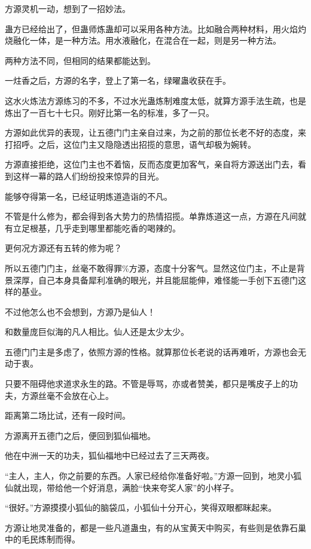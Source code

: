
\begin{this_body}

方源灵机一动，想到了一招妙法。

蛊方已经给出了，但蛊师炼蛊却可以采用各种方法。比如融合两种材料，用火焰灼烧融化一体，是一种方法。用水液融化，在混合在一起，则是另一种方法。

两种方法不同，但相同的结果都能达到。

一炷香之后，方源的名字，登上了第一名，绿曜蛊收获在手。

这水火炼法方源练习的不多，不过水光蛊炼制难度太低，就算方源手法生疏，也是炼出了一百七十七只。刚好比第一名的标准，多了一只。

方源如此优异的表现，让五德门门主亲自过来，为之前的那位长老不好的态度，来打招呼。之后，这位门主又隐隐透出招揽的意思，语气却极为婉转。

方源直接拒绝，这位门主也不着恼，反而态度更加客气，亲自将方源送出门去，看到这样一幕的路人们纷纷投来惊异的目光。

能够夺得第一名，已经证明炼道造诣的不凡。

不管是什么修为，都会得到各大势力的热情招揽。单靠炼道这一点，方源在凡间就有立足根基，几乎走到哪里都能吃香的喝辣的。

更何况方源还有五转的修为呢？

所以五德门门主，丝毫不敢得罪\%方源，态度十分客气。显然这位门主，不止是背景深厚，自己本身具备犀利准确的眼光，并且能屈能伸，难怪能一手创下五德门这样的基业。

不过他怎么也不会想到，方源乃是仙人！

和数量庞巨似海的凡人相比。仙人还是太少太少。

五德门门主是多虑了，依照方源的性格。就算那位长老说的话再难听，方源也会无动于衷。

只要不阻碍他求道求永生的路。不管是辱骂，亦或者赞美，都只是嘴皮子上的功夫，方源丝毫不会放在心上。

距离第二场比试，还有一段时间。

方源离开五德门之后，便回到狐仙福地。

他在中洲一天的功夫，狐仙福地中已经过去了三天两夜。

“主人，主人，你之前要的东西。人家已经给你准备好啦。”方源一回到，地灵小狐仙就出现，带给他一个好消息，满脸“快来夸奖人家”的小样子。

“很好。”方源摸摸小狐仙的脑袋瓜，小狐仙十分开心，笑得双眼都眯起来。

方源让地灵准备的，都是一些凡道蛊虫，有的从宝黄天中购买，有些则是依靠石巢中的毛民炼制而得。


\end{this_body}
